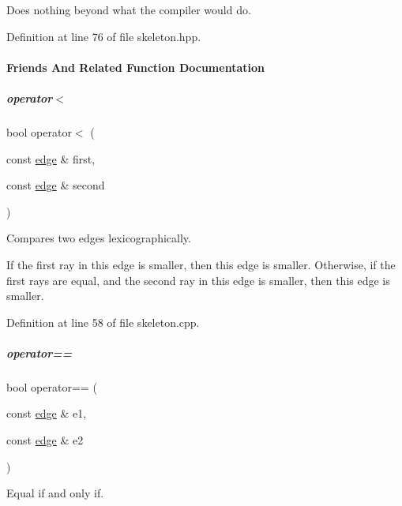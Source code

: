 Does nothing beyond what the compiler would do. 

Definition at line 76 of file skeleton.\+hpp.



\paragraph{Friends And Related Function Documentation}
\mbox{\label{group___c_l_s_solvers_a983f5438e6720d3bc1d7763c0c04fcae}} 
\subparagraph{\texorpdfstring{operator$<$}{operator<}}
{\footnotesize\ttfamily bool operator$<$ (\begin{DoxyParamCaption}\item[{const \hyperlink{group___c_l_s_solvers_classedge}{edge} \&}]{first,  }\item[{const \hyperlink{group___c_l_s_solvers_classedge}{edge} \&}]{second }\end{DoxyParamCaption})\hspace{0.3cm}{\ttfamily [friend]}}



Compares two edges lexicographically. 

If the first ray in {\ttfamily this} edge is smaller, then {\ttfamily this} edge is smaller. Otherwise, if the first rays are equal, and the second ray in {\ttfamily this} edge is smaller, then {\ttfamily this} edge is smaller. 

Definition at line 58 of file skeleton.\+cpp.

\mbox{\label{group___c_l_s_solvers_a87086330455166d1fe4bb71be060fbcc}} 
\subparagraph{\texorpdfstring{operator==}{operator==}}
{\footnotesize\ttfamily bool operator== (\begin{DoxyParamCaption}\item[{const \hyperlink{group___c_l_s_solvers_classedge}{edge} \&}]{e1,  }\item[{const \hyperlink{group___c_l_s_solvers_classedge}{edge} \&}]{e2 }\end{DoxyParamCaption})\hspace{0.3cm}{\ttfamily [friend]}}



Equal if and only if. 


